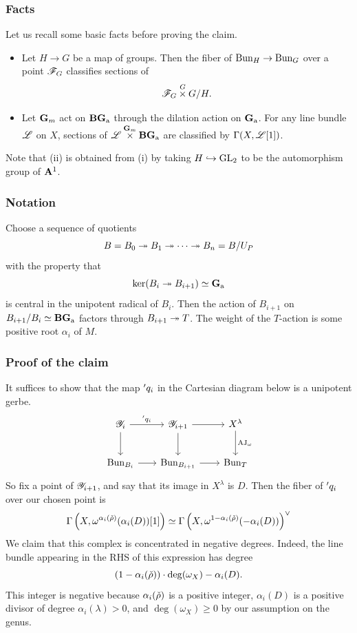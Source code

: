 \subsubsection{Facts} Let us recall some basic facts before proving the claim.
\begin{itemize}
    \item[(i)] Let $H \to G$ be a map of groups. Then the fiber of $\Bun_H \to \Bun_G$ over a point $\FF_G$ classifies sections of \[\FF_G \overset{G}{\times} G/H.\]
    \item[(ii)] Let $\Gm$ act on $\BB \Ga$ through the dilation action on $\Ga$. For any line bundle $\LL$ on $X$, sections of $\LL \overset{\Gm}{\times} \BB \Ga$ are classified by $\Gamma(X, \LL[1])$.
\end{itemize}
Note that (ii) is obtained from (i) by taking $H \mon \GL_2$ to be the automorphism group of $\AA^1$.

\subsubsection{Notation} Choose a sequence of quotients
  \[B = B_0 \epi B_1 \epi \cdots \epi B_n = B/U_P\]
with the property that
  \[\ker(B_i \epi B_{i+1}) \simeq \Ga\]
is central in the unipotent radical of $B_i$. Then the action of $B_{i+1}$ on $B_{i+1}/B_i \simeq \BB \Ga$ factors through $B_{i+1} \epi T$. The weight of the $T$-action is some positive root $\alpha_i$ of $M$.

\subsubsection{Proof of the claim} It suffices to show that the map $\aph q_i$ in the Cartesian diagram below is a unipotent gerbe.
\[
\begin{tikzcd}[
  column sep={6em,between origins},
  row sep={4em,between origins}
]
  \YY_i \arrow[r, "\aph q_i"] \arrow[d] & \YY_{i+1} \arrow[r] \arrow[d] & X^\lambda \arrow[d, "\AJ_\omega"] \\
  \Bun_{B_i} \arrow[r] & \Bun_{B_{i+1}} \arrow[r] & \Bun_T
\end{tikzcd}
\]
So fix a point of $\YY_{i+1}$, and say that its image in $X^\lambda$ is $D$. Then the fiber of $\aph q_i$ over our chosen point is
\begin{equation}
\label{eqn:unipotent_gerbe_complex}
    \Gamma\left(X, \omega^{\alpha_i(\rhov)}(\alpha_i(D))[1] \right)
    \simeq \Gamma \left(X, \omega^{1 - \alpha_i(\rhov)} (-\alpha_i(D)) \right)^\vee
\end{equation}
We claim that this complex is concentrated in negative degrees. Indeed, the line bundle appearing in the RHS of this expression has degree
    \[
    (1 - \alpha_i(\rhov)) \cdot \deg(\omega_X) - \alpha_i(D).
    \]
This integer is negative because $\alpha_i(\rhov)$ is a positive integer, $\alpha_i(D)$ is a positive divisor of degree $\alpha_i(\lambda) > 0$, and $\deg(\omega_X) \ge 0$ by our assumption on the genus.

